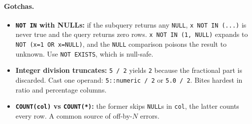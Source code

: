 \paragraph{Gotchas.}
\begin{itemize}
  \item \textbf{\texttt{NOT IN} with NULLs:} if the subquery returns any
  \texttt{NULL}, \texttt{x NOT IN (...)} is never true and the query returns
  zero rows. \texttt{x NOT IN (1, NULL)} expands to
  \texttt{NOT (x=1 OR x=NULL)}, and the \texttt{NULL} comparison poisons the
  result to unknown. Use \texttt{NOT EXISTS}, which is null-safe.
  \item \textbf{Integer division truncates:} \texttt{5 / 2} yields \texttt{2}
  because the fractional part is discarded. Cast one operand:
  \texttt{5::numeric / 2} or \texttt{5.0 / 2}. Bites hardest in ratio and
  percentage columns.
  \item \textbf{\texttt{COUNT(col)} vs \texttt{COUNT(*)}:} the former skips
  \texttt{NULL}s in \texttt{col}, the latter counts every row. A common source
  of off-by-$N$ errors.
\end{itemize}
